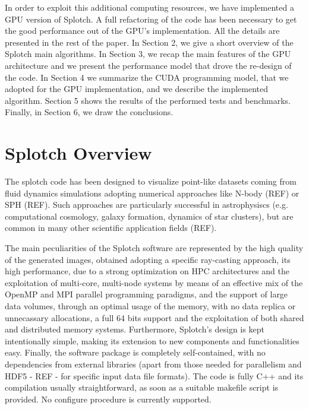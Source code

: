 \documentclass[11pt]{article}
\begin{document}
In order to exploit this additional computing resources, we have implemented 
a GPU version of Splotch. A full refactoring of the code has been necessary 
to get the good performance out of the GPU's implementation. 
All the details are presented in the rest of the paper. In Section 2, we give a short 
overview of the Splotch main algorithms. In Section 3, we recap the main features
of the GPU architecture and we present the performance model that drove the 
re-design of the code. In Section 4 we summarize the CUDA programming model, that we
adopted for the GPU implementation, and we describe the implemented algorithm. Section 5 shows
the results of the performed tests and benchmarks. Finally, in Section 6, we draw 
the conclusions. 

\section{Splotch Overview}

The splotch code has been designed to visualize point-like datasets coming
from fluid dynamics simulations adopting numerical approaches like N-body (REF)
or SPH (REF). Such approaches are particularly successful in astrophysiscs (e.g. computational
cosmology, galaxy formation, dynamics of star clusters), but are common in 
many other scientific application fields (REF).

The main peculiarities of the Splotch software are represented by the 
high quality of the generated images, obtained adopting a specific ray-casting 
approach, its high performance, due to a strong optimization on HPC architectures and the exploitation of multi-core, multi-node 
systems by means of an effective mix of the OpenMP and MPI parallel programming paradigms, and
the support of large data volumes, through an optimal usage of the memory, with
no data replica or unnecassary allocations, a full 64 bits support and the exploitation
of both shared and distributed memory systems. Furthermore, Splotch's design is kept 
intentionally simple, making its extension to new components and functionalities easy. 
Finally, the software package is completely self-contained, with no dependencies from external 
libraries (apart from those needed for parallelism and HDF5 - REF - for
specific input data file formats). The code is fully C++ and its compilation
usually straightforward, as soon as a suitable makefile script is provided.
No configure procedure is currently supported.
\end{document}
